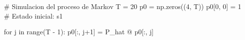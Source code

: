 \begin{appendices}
\begin{listing}[H]
\begin{python}
# Simulacion del proceso de Markov
T = 20
p0 = np.zeros((4, T))
p0[0, 0] = 1  # Estado inicial: s1

for j in range(T - 1):
    p0[:, j+1] = P_hat @ p0[:, j]
\end{python}
\caption{Simulación de la evolución temporal de una cadena de
Markov a partir de la matriz de transición $\hat{P}$.}
\label{lst:simulacion_markov}
\end{listing}

\end{appendices}

